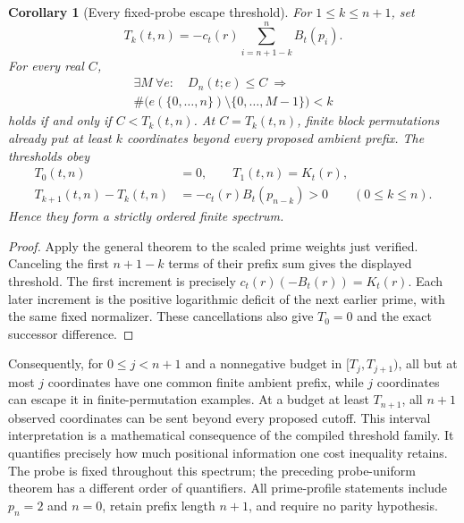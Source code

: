 \documentclass[11pt]{article}
\newtheorem{corollary}[theorem]{Corollary}
\theoremstyle{definition}
\begin{document}
\begin{corollary}[Every fixed-probe escape threshold]
For $1\le k\le n+1$, set
\[
 T_k(t,n)=-c_t(r)\sum_{i=n+1-k}^{n}B_t(p_i).
\]
For every real $C$,
\[
 \begin{gathered}
 \exists M\ \forall e:\quad D_n(t;e)\le C\ \Longrightarrow\\
 \#\bigl(e(\{0,\ldots,n\})\setminus\{0,\ldots,M-1\}\bigr)<k
 \end{gathered}
\]
holds if and only if $C<T_k(t,n)$. At $C=T_k(t,n)$,
finite block permutations already put at least $k$ coordinates
beyond every proposed ambient prefix.
The thresholds obey
\[
 \begin{split}
 T_0(t,n)&=0,\qquad T_1(t,n)=K_t(r),\\
 T_{k+1}(t,n)-T_k(t,n)
   &=-c_t(r)B_t(p_{n-k})>0\qquad(0\le k\le n).
 \end{split}
\]
Hence they form a strictly ordered finite spectrum.
\end{corollary}

\begin{proof}
Apply the general theorem to the scaled prime weights just
verified. Canceling the first $n+1-k$ terms of their prefix sum
gives the displayed threshold. The first increment is precisely
$c_t(r)(-B_t(r))=K_t(r)$. Each later increment is the positive
logarithmic deficit of the next earlier prime, with the same
fixed normalizer. These cancellations also give $T_0=0$ and
the exact successor difference.
\end{proof}

Consequently, for $0\le j<n+1$ and a nonnegative budget in
$[T_j,T_{j+1})$, all but at most $j$ coordinates have one common
finite ambient prefix, while $j$ coordinates can escape it in
finite-permutation examples. At a budget at least $T_{n+1}$,
all $n+1$ observed coordinates can be sent beyond every proposed
cutoff. This interval interpretation is a mathematical consequence
of the compiled threshold family. It quantifies precisely how
much positional information one cost inequality retains.
The probe is fixed throughout this spectrum; the preceding
probe-uniform theorem has a different order of quantifiers.
All prime-profile statements include $p_n=2$ and $n=0$, retain
prefix length $n+1$, and require no parity hypothesis.
\end{document}
